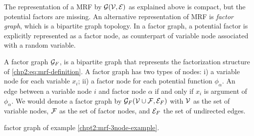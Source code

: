 The representation of a MRF by $\mathcal{G}(\mathcal{V}, \mathcal{E})$ as explained above is compact, but the potential factors are missing. An alternative representation of MRF is \textit{factor graph}\cite{}, which is a bipartite graph topology. In a factor graph, a potential factor is explicitly represented as a factor node, as counterpart of variable node associated with a random variable.
\begin{definition}\label{chpt2:def:factor-graph}
  A factor graph $\mathcal{G}_F$, is a bipartite graph that represents the factorization structure of \eqref{chp2:eq:mrf-definition}. A factor graph has two types of nodes: i) a variable node for each variable $x_i$; ii) a factor node for each potential function $\phi_{\alpha}$. An edge between a variable node $i$ and factor node $\alpha$ if and only if $x_i$ is argument of $\phi_{\alpha}$. We would denote a factor graph by $\mathcal{G}_F(\mathcal{V} \cup \mathcal{F}, \mathcal{E}_F)$ with $\mathcal{V}$ as the set of variable nodes, $\mathcal{F}$ as the set of factor nodes, and $\mathcal{E}_F$ the set of undirected edges.
\end{definition}
\begin{example}
  factor graph of example \ref{chpt2:mrf-3node-example}.
\end{example}



